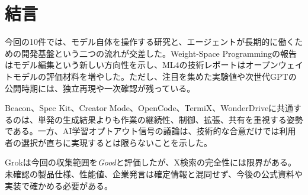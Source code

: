 \section*{結言}
今回の10件では、モデル自体を操作する研究と、エージェントが長期的に働くための開発基盤という二つの流れが交差した。Weight-Space Programmingの報告はモデル編集という新しい方向性を示し、ML4の技術レポートはオープンウェイトモデルの評価材料を増やした。ただし、注目を集めた実験値や次世代GPTの公開時期には、独立再現や一次確認が残っている。

Beacon、Spec Kit、Creator Mode、OpenCode、TermiX、WonderDriveに共通するのは、単発の生成結果よりも作業の継続性、制御、拡張、共有を重視する姿勢である。一方、AI学習オプトアウト信号の議論は、技術的な合意だけでは利用者の選択が直ちに実現するとは限らないことを示した。

Grokは今回の収集範囲を\textit{Good}と評価したが、X検索の完全性には限界がある。未確認の製品仕様、性能値、企業発言は確定情報と混同せず、今後の公式資料や実装で確かめる必要がある。
